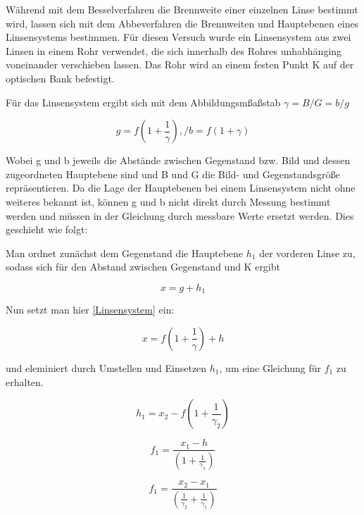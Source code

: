 Während mit dem Besselverfahren die Brennweite einer einzelnen Linse bestimmt wird, lassen sich mit dem Abbeverfahren die Brennweiten und Hauptebenen eines Linsensystems bestimmen.
Für diesen Versuch wurde ein Linsensystem aus zwei Linsen in einem Rohr verwendet, die sich innerhalb des Rohres unhabhänging voneinander verschieben lassen.
Das Rohr wird an einem festen Punkt K auf der optischen Bank befestigt.

Für das Linsensystem ergibt sich mit dem Abbildungsmßaßstab $\gamma = B/G = b/g$

\begin{equation} \label{Linsensystem}
    g = f(1 + \frac{1}{\gamma}),/ b = f(1+\gamma)
\end{equation}

Wobei g und b jeweils die Abstände zwischen Gegenstand bzw. Bild und dessen zugeordneten Hauptebene sind und B und G die Bild- und Gegenstandsgröße repräsentieren.
Da die Lage der Hauptebenen bei einem Linsensystem nicht ohne weiteres bekannt ist, können g und b nicht direkt durch Messung bestimmt werden und müssen in der Gleichung
durch messbare Werte ersetzt werden.
Dies geschieht wie folgt:

Man ordnet zunächst dem Gegenstand die Hauptebene $h_1$ der vorderen Linse zu, sodass sich für den Abstand zwischen Gegenstand und K ergibt

\begin{equation} \label{x1}
    x = g + h_1
\end{equation}

Nun setzt man hier \ref{Linsensystem} ein:

\begin{equation} \label{x2}
    x = f(1 + \frac{1}{\gamma}) + h
\end{equation}

und eleminiert durch Umstellen und Einsetzen $h_1$, um eine Gleichung für $f_1$ zu erhalten.

\begin{equation} \label{1}
    h_1 = x_2 - f(1 + \frac{1}{\gamma_2})
\end{equation}

\begin{equation} \label{3}
    f_1 = \frac{x_1 - h}{(1 + \frac{1}{\gamma_1})}
\end{equation}

\begin{equation} \label{4}
    f_1 = \frac{x_2 - x_1}{(\frac{1}{\gamma_2} + \frac{1}{\gamma_1})}
\end{equation}

